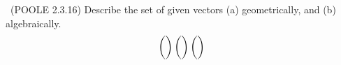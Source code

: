\begin{problem}{\problemnum \, \textsf{(POOLE 2.3.16)}}
    Describe the set of given vectors (a) geometrically, and (b) algebraically.
    $$ \begin{pmatrix}    \\    \\  \end{pmatrix}
       \begin{pmatrix}    \\    \\  \end{pmatrix}
       \begin{pmatrix}    \\    \\  \end{pmatrix}
    $$
\end{problem}
\begin{solution}
\end{solution}
